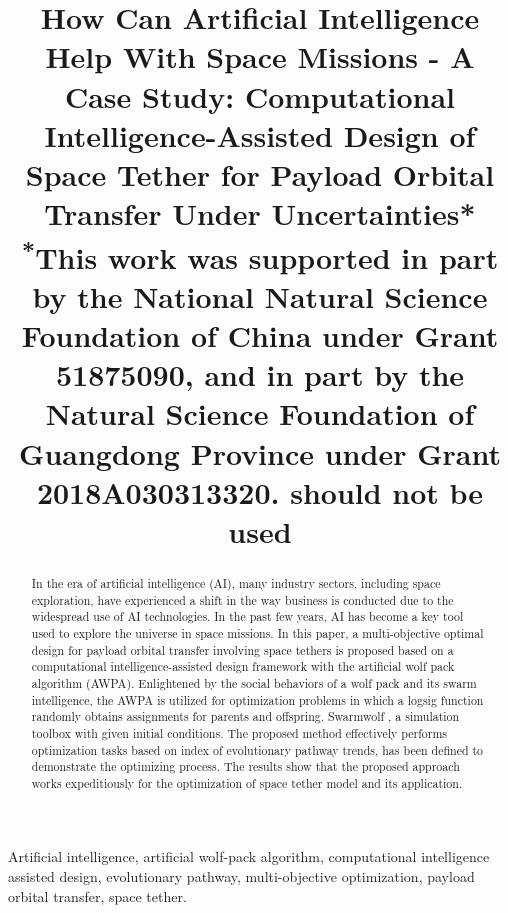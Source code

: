 \documentclass[conference]{IEEEtran}
\begin{document}
\title{How Can Artificial Intelligence Help With Space
Missions - A Case Study: Computational
Intelligence-Assisted Design of Space Tether for
Payload Orbital Transfer Under Uncertainties*\\
{\footnotesize \textsuperscript{*}This work was supported in part by the National Natural Science Foundation of China under Grant 51875090, and in part by the Natural
Science Foundation of Guangdong Province under Grant 2018A030313320.
should not be used}
}

\author{
\and
{}

}

\maketitle

\begin{abstract}
In the era of artificial intelligence (AI), many industry sectors, including space exploration,
have experienced a shift in the way business is conducted due to the widespread use of AI technologies.
In the past few years, AI has become a key tool used to explore the universe in space missions. In this paper,
a multi-objective optimal design for payload orbital transfer involving space tethers is proposed based on
a computational intelligence-assisted design framework with the artificial wolf pack algorithm (AWPA).
Enlightened by the social behaviors of a wolf pack and its swarm intelligence, the AWPA is utilized for
optimization problems in which a logsig function randomly obtains assignments for parents and offspring.
Swarmwolf , a simulation toolbox with given initial conditions. The proposed method effectively performs
optimization tasks based on index of evolutionary pathway trends, has been defined to demonstrate the
optimizing process. The results show that the proposed approach works expeditiously for the optimization
of space tether model and its application.
\end{abstract}

\begin{IEEEkeywords}
Artificial intelligence, artificial wolf-pack algorithm, computational intelligence assisted
design, evolutionary pathway, multi-objective optimization, payload orbital transfer, space tether.
\end{IEEEkeywords}
\end{document}
